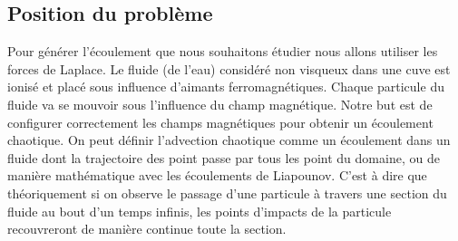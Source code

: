 \documentclass[a4paper,12pt,titlepage]{report}
\begin{document}
\begin{onehalfspace}

\chapter{Position du problème}

Pour générer l'écoulement que nous souhaitons étudier nous allons utiliser les forces de Laplace. Le fluide (de l'eau) considéré non visqueux dans une cuve est ionisé et placé sous influence d'aimants ferromagnétiques. Chaque particule du fluide va se mouvoir sous l'influence du champ magnétique. Notre but est de configurer correctement les champs magnétiques pour obtenir un écoulement chaotique. On peut définir l'advection chaotique comme un écoulement dans un fluide dont la trajectoire des point passe par tous les point du domaine, ou de manière mathématique avec les écoulements de Liapounov.
C'est à dire que théoriquement si on observe le passage d'une particule à travers une section du fluide au bout d'un temps infinis, les points d'impacts de la particule recouvreront de manière continue toute la section.

\end{onehalfspace}
\end{document}
